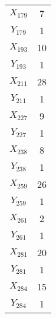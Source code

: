 \documentclass[a4paper,10pt]{article}
\begin{document}
\begin{center}
\begin{longtable}{cc}
$X_{179}$ & 7 \\
$Y_{179}$ & 1 \\
$X_{193}$ & 10 \\
$Y_{193}$ & 1 \\
$X_{211}$ & 28 \\
$Y_{211}$ & 1 \\
$X_{227}$ & 9 \\
$Y_{227}$ & 1 \\
$X_{238}$ & 8 \\
$Y_{238}$ & 1 \\
$X_{259}$ & 26 \\
$Y_{259}$ & 1 \\
$X_{261}$ & 2 \\
$Y_{261}$ & 1 \\
$X_{281}$ & 20 \\
$Y_{281}$ & 1 \\
$X_{284}$ & 15 \\
$Y_{284}$ & 1 \\
\end{longtable}
\end{center}
\end{document}
